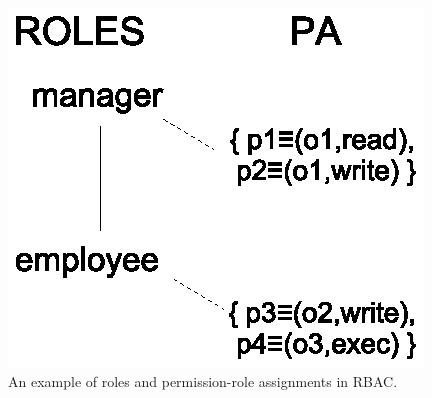  \begin{figure}
 	\centering
 	\includegraphics[width=.5\textwidth]{ABAC16/rbac-labac-example}
 	\caption{An example of roles and permission-role assignments in RBAC.}
 	\label{fig:rbac-labac-example}
 \end{figure}